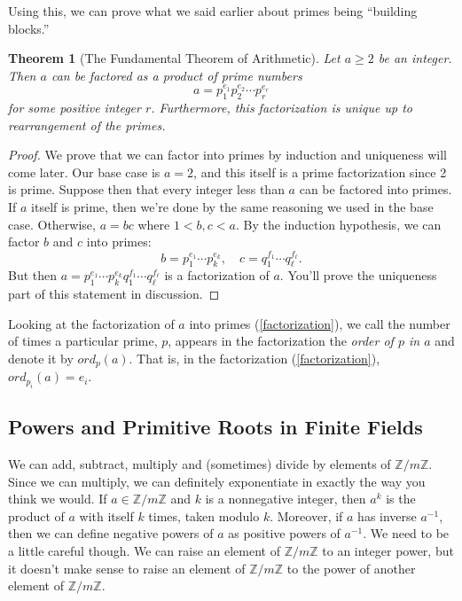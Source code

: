 \documentclass[12pt]{article}
\theoremstyle{plain}
\newtheorem{theorem}{Theorem}[section]
\theoremstyle{definition}
\theoremstyle{remark}
\newcommand{\Z}{\mathbb{Z}}
\begin{document}
Using this, we can prove what we said earlier about primes being ``building blocks.''

\begin{theorem}[The Fundamental Theorem of Arithmetic]
    Let $a\geq 2$ be an integer. Then $a$ can be factored as a product of prime numbers
    \begin{equation}\label{factorization}
        a = p_1^{e_1}p_2^{e_2}\cdots p_r^{e_r}
    \end{equation}
    for some positive integer $r$.
    Furthermore, this factorization is unique up to rearrangement of the primes.
\end{theorem}
\begin{proof}
    We prove that we can factor into primes by induction and uniqueness will come later.
    Our base case is $a=2$, and this itself is a prime factorization since 2 is prime.
    Suppose then that every integer less than $a$ can be factored into primes.
    If $a$ itself is prime, then we're done by the same reasoning we used in the base case.
    Otherwise, $a = bc$ where $1 < b,c < a$.
    By the induction hypothesis, we can factor $b$ and $c$ into primes:
    \[
        b = p_1^{e_1}\cdots p_k^{e_k},\quad c= q_1^{f_1}\cdots q_\ell^{f_\ell}.
    \]
    But then $a = p_1^{e_1}\cdots p_k^{e_k}q_1^{f_1}\cdots q_\ell^{f_\ell}$ is a factorization of $a$.
    You'll prove the uniqueness part of this statement in discussion.
\end{proof}

Looking at the factorization of $a$ into primes (\ref{factorization}), we call the number of times a particular prime, $p$, appears in the factorization the \emph{order of $p$ in $a$} and denote it by $ord_p(a)$.
That is, in the factorization (\ref{factorization}), $ord_{p_i}(a) = e_i$.











\subsection{Powers and Primitive Roots in Finite Fields}


We can add, subtract, multiply and (sometimes) divide by elements of $\Z/m\Z$.
Since we can multiply, we can definitely exponentiate in exactly the way you think we would.
If $a\in \Z/m\Z$ and $k$ is a nonnegative integer, then $a^k$ is the product of $a$ with itself $k$ times, taken modulo $k$.
Moreover, if $a$ has inverse $a^{-1}$, then we can define negative powers of $a$ as positive powers of $a^{-1}$.
We need to be a little careful though.
We can raise an element of $\Z/m\Z$ to an integer power, but it doesn't make sense to raise an element of $\Z/m\Z$ to the power of another element of $\Z/m\Z$.
\end{document}
